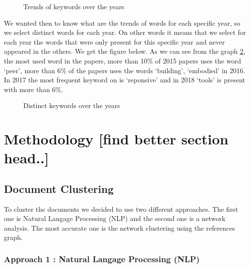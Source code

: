 \documentclass[article,twocolumn]{IEEEtran}
\begin{document}
    \begin{figure}
        \begin{center}\end{center}
        \caption{Trends of keywords over the years}
        \label{fig1}
    \end{figure}
    
    We wanted then to know what are the trends of words for each specific
year, so we select distinct words for each year. On other words it means
that we select for each year the words that were only present for this
specific year and never appeared in the others. We get the figure below.
As we can see from the graph \ref{fig2}, the most used word in the
papers, more than 10\% of 2015 papers uses the word `peer', more than
6\% of the papers uses the words `building', `embodied' in 2016. In 2017
the most frequent keyword on is `reponsive' and in 2018 `tools' is
present with more than 6\%.


    \begin{figure}
        \begin{center}\end{center}
        \caption{Distinct keywords over the years}
        \label{fig2}
    \end{figure}
    
    \hypertarget{methodology-find-better-section-head..}{%
\section{Methodology {[}find better section
head..{]}}\label{methodology-find-better-section-head..}}

    \hypertarget{document-clustering}{%
\subsection{Document Clustering}\label{document-clustering}}

To cluster the documents we decided to use two different approaches. The
first one is Natural Langage Processing (NLP) and the second one is a
network analysis. The most accurate one is the network clustering using
the references graph.

\hypertarget{approach-1-natural-langage-processing-nlp}{%
\subsubsection{Approach 1 : Natural Langage Processing
(NLP)}\label{approach-1-natural-langage-processing-nlp}}
\end{document}
